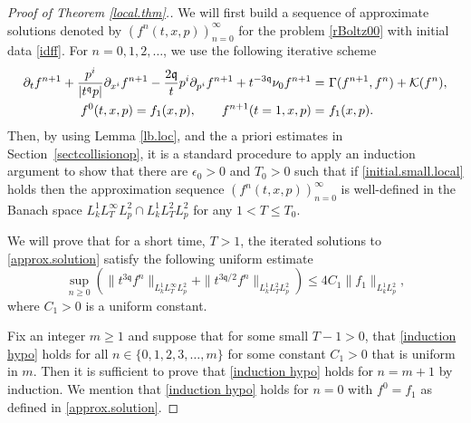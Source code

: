 \documentclass[reqno]{amsart}
\newcommand{\pv}{p}
\newcommand{\secref}[1]{Section~\ref{#1}}
\newcommand{\qq}{\mathfrak{q}}
\newcommand{\tq}{t^{\qq}}
\newcommand{\tTq}{t^{3\qq}}
\newcommand{\compK}{\mathcal{K}}
\theoremstyle{definition}
\numberwithin{equation}{section}
\numberwithin{theorem}{section}
\begin{document}
\begin{proof}[Proof of Theorem \ref{local.thm}.]  We will first build a sequence of approximate solutions denoted by $(f^n(t,x,\pv))_{n=0}^\infty$ for the problem
\eqref{rBoltz00} with initial data \eqref{idff}.  For $n=0,1,2,\ldots$, we use the following iterative scheme 
\begin{align}\notag
        \partial_t f^{n+1}+ \frac{\pv^i}{|\tq \pv|}\partial_{x^i} f^{n+1}
    -\frac{2\qq }{t} p^i \partial_{p^i} f^{n+1}
    + t^{-3\qq} \nu_0 f^{n+1}
= &~
\Gamma(f^{n+1},f^{n})
+
\compK (f^{n}),
\\  \label{approx.solution}
f^{0}(t,x,\pv)
= 
f_1(x,\pv), \qquad 
f^{n+1}(t=1,x,\pv)
= &~
f_1(x,\pv).
\end{align}
Then, by using Lemma \ref{lb.loc}, and the a priori estimates in \secref{sectcollisionop}, it is a standard  procedure to apply an induction argument to show that there are $\epsilon_0>0$ and $T_0>0$ such that if \eqref{initial.small.local} holds then the approximation sequence $(f^n(t,x,\pv))_{n=0}^\infty$ is well-defined in the Banach space $L^1_{k}L^\infty_{T}L^2_{\pv}\cap L^1_{k}L^2_{T}L^2_{\pv}$ for any $1<T\leq T_0$.    

 We will prove that for a short time, $T>1$, the iterated solutions to \eqref{approx.solution} satisfy the following uniform estimate
    \begin{equation}\label{induction hypo}
        \sup_{n\ge 0}
        \left( \| \tTq f^{n}\|_{L^1_{{k}}L^\infty_{T}L^2_{\pv}}+\| t^{3\qq/2} f^{n}\|_{L^1_{{k}}L^2_{T}L^2_{\pv}}\right)
        \le 4C_1\|f_1\|_{L^1_{{k}}L^2_{\pv}},
\end{equation}
where $C_1>0$ is a uniform constant.

    
Fix an integer $m\ge 1$ and suppose that for some small $T-1> 0$, that
\eqref{induction hypo} holds for 
all $n\in\{0,1,2,3, \ldots,m\}$ for some constant $C_1>0$ that is uniform in $m$.  Then it is sufficient to prove that \eqref{induction hypo} holds for $n=m+1$ by induction.  We mention that \eqref{induction hypo} holds for $n=0$ with $f^0=f_1$ as defined in \eqref{approx.solution}.



\end{proof}
\end{document}
